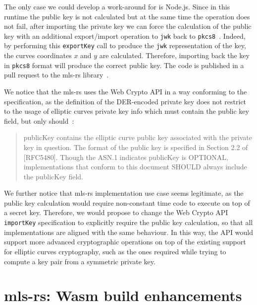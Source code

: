 The only case we could develop a work-around for is Node.js. Since in this runtime
the public key is not calculated but at the same time the operation does not fail,
after importing the private key we can force the calculation of the public key with an additional
export/import operation to \texttt{jwk} back to \texttt{pkcs8}~\cite{JsonWebKey, rfc5958}.
Indeed, by performing this \texttt{exportKey} call to produce the \texttt{jwk}
representation of the key, the curves coordinates $x$ and $y$ are calculated.
Therefore, importing back the key in \texttt{pkcs8} format will produce the correct
public key. The code is published in a pull request to the mls-rs library~\cite{AWSNodeJSCodeContributions}.

We notice that the mls-rs uses the Web Crypto API in a way conforming to the
specification, as the definition of the DER-encoded private key does not
restrict to the usage of elliptic curves private key info which must 
contain the public key field, but only should~\cite{rfc5915}:
\begin{quote}
    publicKey contains the elliptic curve public key associated with
    the private key in question.  The format of the public key is
    specified in Section 2.2 of [RFC5480].  Though the ASN.1 indicates
    publicKey is OPTIONAL, implementations that conform to this
    document SHOULD always include the publicKey field.
\end{quote}
We further notice that mls-rs implementation use case seems legitimate,
as the public key calculation would require non-constant time code
to execute on top of a secret key. Therefore, we would propose
to change the Web Crypto API \texttt{importKey} specification to
explicitly require the public key calculation, so that all
implementations are aligned with the same behaviour. In this way,
the API would support more advanced cryptographic operations on top
of the existing support for elliptic curves cryptography, such as the ones
required while trying to compute a key pair from a symmetric private key.

\section{mls-rs: Wasm build enhancements}\label{sc:MLS-enhancements}

